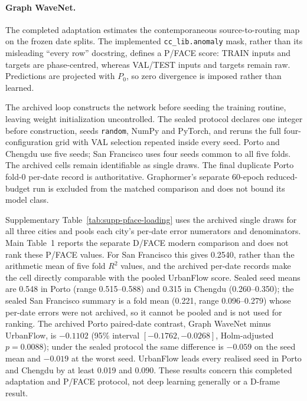 
\paragraph{Graph WaveNet.} The completed adaptation \cite{wu2019graphwavenet} estimates the contemporaneous source-to-routing map on the frozen date splits. The implemented \texttt{cc\_lib.anomaly} mask, rather than its misleading ``every row'' docstring, defines a P/FACE score: TRAIN inputs and targets are phase-centred, whereas VAL/TEST inputs and targets remain raw. Predictions are projected with $P_0$, so zero divergence is imposed rather than learned.

The archived loop constructs the network before seeding the training routine, leaving weight initialization uncontrolled. The sealed protocol declares one integer before construction, seeds \texttt{random}, NumPy and PyTorch, and reruns the full four-configuration grid with VAL selection repeated inside every seed. Porto and Chengdu use five seeds; San Francisco uses four seeds common to all five folds. The archived cells remain identifiable as single draws. The final duplicate Porto fold-0 per-date record is authoritative. Graphormer's separate 60-epoch reduced-budget run is excluded from the matched comparison and does not bound its model class.

Supplementary Table~\ref{tab:supp-pface-loading} uses the archived single draws for all three cities and pools each city's per-date error numerators and denominators. Main Table~1 reports the separate D/FACE modern comparison and does not rank these P/FACE values. For San Francisco this gives 0.2540, rather than the arithmetic mean of five fold $R^2$ values, and the archived per-date records make the cell directly comparable with the pooled UrbanFlow score. Sealed seed means are 0.548 in Porto (range 0.515--0.588) and 0.315 in Chengdu (0.260--0.350); the sealed San Francisco summary is a fold mean (0.221, range 0.096--0.279) whose per-date errors were not archived, so it cannot be pooled and is not used for ranking. The archived Porto paired-date contrast, Graph WaveNet minus UrbanFlow, is $-0.1102$ (95\% interval $[-0.1762,-0.0268]$, Holm-adjusted $p=0.0088$); under the sealed protocol the same difference is $-0.059$ on the seed mean and $-0.019$ at the worst seed. UrbanFlow leads every realised seed in Porto and Chengdu by at least 0.019 and 0.090. These results concern this completed adaptation and P/FACE protocol, not deep learning generally or a D-frame result.

